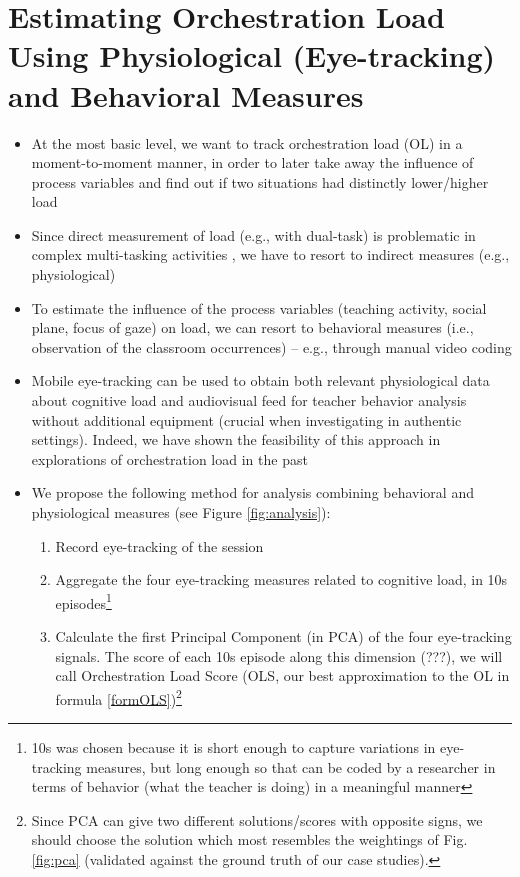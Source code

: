 \documentclass[10pt,journal,compsoc]{IEEEtran}
\begin{document}
\section{Estimating Orchestration Load Using Physiological (Eye-tracking) and Behavioral Measures}
\label{sec:measures}
\begin{itemize}
\item At the most basic level, we want to track orchestration load (OL) in a moment-to-moment manner, in order to later take away the influence of process variables and find out if two situations had distinctly lower/higher load
\item Since direct measurement of load (e.g., with dual-task) is problematic in complex multi-tasking activities \cite{Paas2003}, we have to resort to indirect measures (e.g., physiological)
\item To estimate the influence of the process variables (teaching activity, social plane, focus of gaze) on load, we can resort to behavioral measures (i.e., observation of the classroom occurrences) -- e.g., through manual video coding
\item Mobile eye-tracking can be used to obtain both relevant physiological data about cognitive load \cite{Buettner2013} and audiovisual feed for teacher behavior analysis without additional equipment (crucial when investigating in authentic settings). Indeed, we have shown the feasibility of this approach in explorations of orchestration load in the past \cite{Prieto2014,Prieto2015cscl,Prieto2015ectel}
\item We propose the following method for analysis combining behavioral and physiological measures (see Figure \ref{fig:analysis}):
\begin{enumerate}
\item Record eye-tracking of the session
\item Aggregate the four eye-tracking measures related to cognitive load, in 10s episodes\footnote{10s was chosen because it is short enough to capture variations in eye-tracking measures, but long enough so that can be coded by a researcher in terms of behavior (what the teacher is doing) in a meaningful manner}
\item Calculate the first Principal Component (in PCA) of the four eye-tracking signals. The score of each 10s episode along this dimension (???), we will call Orchestration Load Score (OLS, our best approximation to the OL in formula \ref{formOLS})\footnote{Since PCA can give two different solutions/scores with opposite signs, we should choose the solution which most resembles the weightings of Fig. \ref{fig:pca} (validated against the ground truth of our case studies).} 

\end{enumerate}
\end{itemize}
\end{document}
